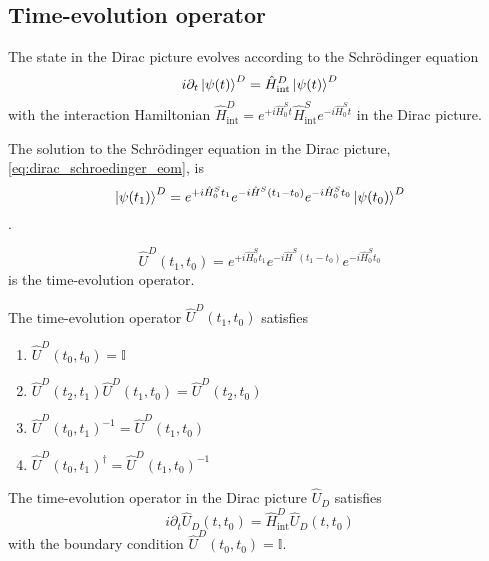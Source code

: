 \subsection{Time-evolution operator}

\begin{lemma}\label{thm:dirac_schroedinger_eom}
	The state in the Dirac picture evolves according to the Schrödinger equation
	\begin{equation}
		i\partial_t
		\ket{\psi(t)}^D
		=
		\hat{H}_\text{int}^D
		\ket{\psi(t)}^D
		\label{eq:dirac_schroedinger_eom}
	\end{equation}
	with the interaction Hamiltonian $\hat{H}_\text{int}^D=e^{+i\hat{H}_0^St}\hat{H}_\text{int}^Se^{-i\hat{H}_0^St}$ in the Dirac picture.
\end{lemma}
\begin{theorem}
	The solution to the Schrödinger equation in the Dirac picture, \cref{eq:dirac_schroedinger_eom}, is
	\begin{equation}
		\ket{\psi(t_1)}^D
		=
		e^{+i\hat{H}_0^St_1}
		e^{-i\hat{H}^S(t_1-t_0)}
		e^{-i\hat{H}_0^St_0}
		\ket{\psi(t_0)}^D
	\end{equation}
	.
\end{theorem}
\begin{definition}
	\begin{equation}
		\hat{U}^D(t_1,t_0)
		=
		e^{+i\hat{H}_0^St_1}
		e^{-i\hat{H}^S(t_1-t_0)}
		e^{-i\hat{H}_0^St_0}		
	\end{equation}
	is the time-evolution operator.
\end{definition}
\begin{lemma}
	The time-evolution operator $\hat{U}^D(t_1,t_0)$ satisfies
	\begin{enumerate}
		\item $\hat{U}^D(t_0,t_0)=\mathbb{I}$
		\item $\hat{U}^D(t_2,t_1)\hat{U}^D(t_1,t_0)=\hat{U}^D(t_2,t_0)$
		\item $\hat{U}^D(t_0,t_1)^{-1}=\hat{U}^D(t_1,t_0)$
		\item $\hat{U}^D(t_0,t_1)^\dagger=\hat{U}^D(t_1,t_0)^{-1}$
	\end{enumerate}
\end{lemma}
\begin{corollary}
	The time-evolution operator in the Dirac picture $\hat{U}_D$ satisfies
	\begin{equation}
		i\partial_t
		\hat{U}_D(t,t_0)
		=
		\hat{H}^D_\text{int}
		\hat{U}_D(t,t_0)
		\label{eq:time_evolution_diff}
	\end{equation}
	with the boundary condition $\hat{U}^D(t_0,t_0)=\mathbb{I}$.
\end{corollary}

